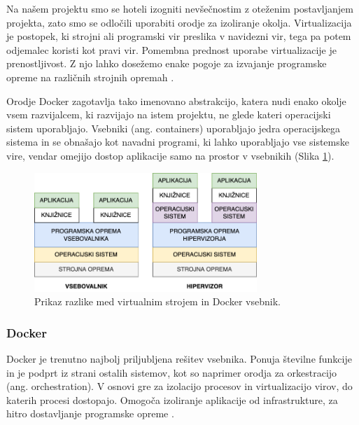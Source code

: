 \documentclass[a4paper, 12pt]{book}
\begin{document}
Na našem projektu smo se hoteli izogniti nevšečnostim z oteženim postavljanjem projekta, zato smo se odločili uporabiti orodje za izoliranje okolja. Virtualizacija je postopek, ki strojni ali programski vir preslika v navidezni vir, tega pa potem odjemalec koristi kot pravi vir. Pomembna prednost uporabe virtualizacije je prenostljivost. Z njo lahko dosežemo enake pogoje za izvajanje programske opreme na različnih strojnih opremah \cite{docker-in-action}.

Orodje Docker zagotavlja tako imenovano abstrakcijo, katera nudi enako okolje vsem razvijalcem, ki razvijajo na istem projektu, ne glede kateri operacijski sistem uporabljajo. Vsebniki (ang. containers) uporabljajo jedra operacijskega sistema in se obnašajo kot navadni programi, ki lahko uporabljajo vse sistemske vire, vendar omejijo dostop aplikacije samo na prostor v vsebnikih (Slika \ref{docker-vs-vm}). \clearpage

\begin{figure}[h]
\begin{center}
\includegraphics[width=0.75\textwidth]{slike/docker-vs-vm.png}
\end{center}
\caption{ Prikaz razlike med virtualnim strojem in Docker vsebnik. }
\label{docker-vs-vm}
\end{figure}

\subsubsection{Docker}
\label{docker-section}
Docker je trenutno najbolj priljubljena rešitev vsebnika. Ponuja številne funkcije in je podprt iz strani ostalih sistemov, kot so naprimer orodja za orkestracijo (ang. orchestration). V osnovi gre za izolacijo procesov in virtualizacijo virov, do katerih procesi dostopajo. Omogoča izoliranje aplikacije od infrastrukture, za hitro dostavljanje programske opreme \cite{linuxcontainers}. 
\end{document}
